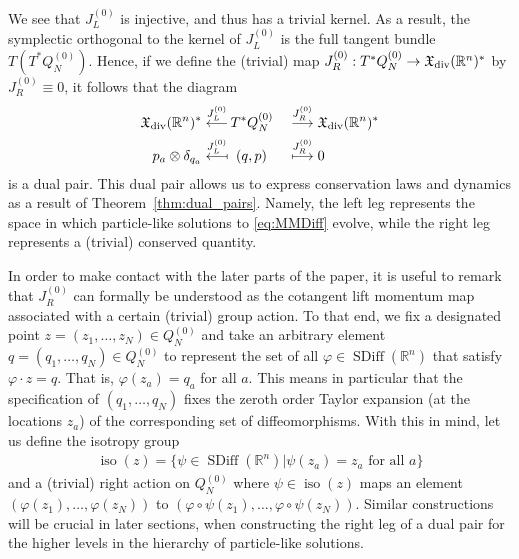 \documentclass[12pt]{amsart}
\newcommand{\R}{\ensuremath{\mathbb{R}}}
\DeclareMathOperator{\SDiff}{SDiff}
\DeclareMathOperator{\iso}{iso}
\begin{document}
  We see that $J_L^{(0)}$ is injective, and thus has a trivial kernel. As a result, the symplectic orthogonal to the kernel of $J_L^{(0)}$  is the full tangent bundle $T(T^*Q_N^{(0)})$. Hence, if we define the (trivial) map $J_R^{(0)}: T^*Q^{(0)}_N \to \mathfrak{X}_{\rm div}(\mathbb{R}^n)^*$ by $J_R^{(0)} \equiv 0$, it follows that the diagram
 \begin{alignat*}{2}
    \mathfrak{X}_{\rm div}(\R^n)^* \stackrel{J_L^{(0)} }{\longleftarrow}&
    \,T^* Q_N^{(0)}
    &&\stackrel{J_R^{(0)} }{\longrightarrow} \mathfrak{X}_{\rm div}(\R^n)^* \\
    p_a \otimes \delta_{q_a} \stackrel{J_L^{(0)}}{\longmapsfrom}&
    \;\;(q,p)
    &&\stackrel{J_R^{(0)} }{\longmapsto} 0
  \end{alignat*}
  is a dual pair. 
  This dual pair allows us to express conservation
  laws and dynamics as a result of Theorem~\ref{thm:dual_pairs}.
   Namely, the left leg represents the space in which particle-like
  solutions to \eqref{eq:MMDiff} evolve,
  while the right leg represents a (trivial) conserved quantity. 
    
  In order to make contact with the later parts of the paper, it is useful to remark that $J_R^{(0)}$ can formally be understood as the cotangent lift momentum map associated with a certain (trivial) group action.
  To that end, we fix a designated point $z = (z_1, \ldots, z_N) \in Q_N^{(0)}$ and take an arbitrary element $ q= (q_1, \ldots, q_N) \in Q_N^{(0)}$ to represent the set of all $\varphi \in \SDiff(\mathbb{R}^n)$ that satisfy $\varphi \cdot z  = q$.
  That is, $\varphi(z_a) = q_a$ for all $a$.
  This means in particular that the specification of $(q_1, \ldots, q_N)$ fixes the zeroth order Taylor expansion (at the locations $z_a$) of the corresponding set of diffeomorphisms. With this in mind, let us define the isotropy group
\begin{align}
\iso(z)  = \{ \psi \in \SDiff(\mathbb{R}^n) | \psi(z_a) = z_a \mbox{ for all } a\} \label{isotropy_group}
\end{align}
and a (trivial) right action on $Q_N^{(0)}$ where $\psi \in \iso(z)$ maps an element $(\varphi(z_1), \ldots, \varphi(z_N))$ to $( \varphi \circ \psi (z_1), \ldots, \varphi \circ \psi(z_N))$.
Similar constructions will be crucial in later sections, when constructing the right leg of a dual pair for the higher levels in the hierarchy of particle-like solutions.
\end{document}
